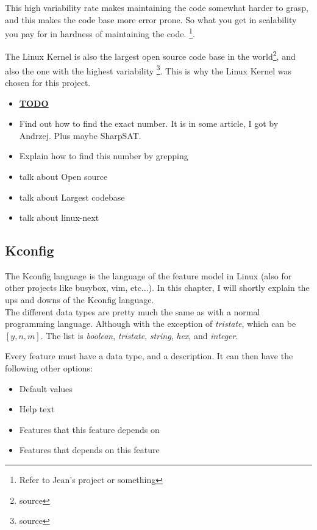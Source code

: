\documentclass[a4paper,11pt]{article}
\begin{document}
This high variability rate makes maintaining the code somewhat harder to 
grasp, and this makes the code base more error prone. So what you get in 
scalability you pay for in hardness of maintaining the code. \footnote{Refer 
to Jean's project or something}.

The Linux Kernel is also the largest open source code base in the 
world\footnote{source}, and also the one with the highest variability 
\footnote{source}. This is why the Linux Kernel was chosen for this project.



\begin{itemize}
    \item \underline{\textbf{TODO}}
    \item Find out how to find the exact number. It is in some article, I got by Andrzej. Plus maybe SharpSAT.
    \item Explain how to find this number by grepping
    \item talk about Open source
    \item talk about Largest codebase
    \item talk about linux-next
\end{itemize}


\subsection{Kconfig}

The Kconfig language is the language of the feature model in Linux (also for 
other projects like busybox, vim, etc...). In this chapter, I will shortly 
explain the ups and downs of the Kconfig language. \\


The different data types are pretty much the same as with a normal programming 
language. Although with the exception of \emph{tristate}, which can be $[y, n, 
m]$. The list is \emph{boolean}, \emph{tristate}, \emph{string}, \emph{hex}, 
and \emph{integer}.

Every feature must have a data type, and a description. It can then have the 
following other options:

\begin{itemize}
    \item Default values
    \item Help text
    \item Features that this feature depends on
    \item Features that depends on this feature
\end{itemize}
\end{document}
